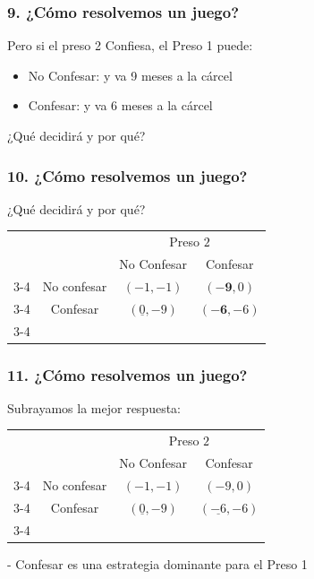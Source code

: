 \documentclass[14pt]{beamer}
\begin{document}
\begin{frame}
\frametitle{9. ¿Cómo resolvemos un juego?}
Pero si el preso 2 Confiesa, el Preso 1 puede: \vspace{2mm}
\begin{itemize}
    \item  No Confesar: y va 9 meses a la cárcel \\ \vspace{2mm}
    \item Confesar: y va 6 meses a la cárcel
    \\ \vspace{2mm}
\end{itemize}
¿Qué decidirá y por qué?
\end{frame}

\begin{frame}
\frametitle{10. ¿Cómo resolvemos un juego?}
¿Qué decidirá y por qué?
\begin{table}
     \begin{tabular}{cc|c|c|}
      & \multicolumn{1}{c}{} & \multicolumn{2}{c}{Preso $2$}\\
      & \multicolumn{1}{c}{} & \multicolumn{1}{c}{No Confesar}  & \multicolumn{1}{c}{Confesar} \\\cline{3-4}
      \multirow{}{Preso $1$}  & No confesar & $(-1, -1)$ & $(\boldsymbol{-9},0)$ \\\cline{3-4}
      & Confesar & $(\underline{0},-9)$ & $(\boldsymbol{-6},-6)$ \\\cline{3-4}
    \end{tabular}
  \end{table}
\end{frame}

\begin{frame}
\frametitle{11. ¿Cómo resolvemos un juego?}
Subrayamos la mejor respuesta:
\begin{table}
     \begin{tabular}{cc|c|c|}
      & \multicolumn{1}{c}{} & \multicolumn{2}{c}{Preso $2$}\\
      & \multicolumn{1}{c}{} & \multicolumn{1}{c}{No Confesar}  & \multicolumn{1}{c}{Confesar} \\\cline{3-4}
      \multirow{}{Preso $1$}  & No confesar & $(-1,-1)$ & $(-9,0)$ \\\cline{3-4}
      & Confesar & $(\underline{0},-9)$ & $(\underline{-6},-6)$ \\\cline{3-4}
    \end{tabular}
  \end{table}
- Confesar es una estrategia dominante para el Preso 1
\end{frame}
\end{document}
